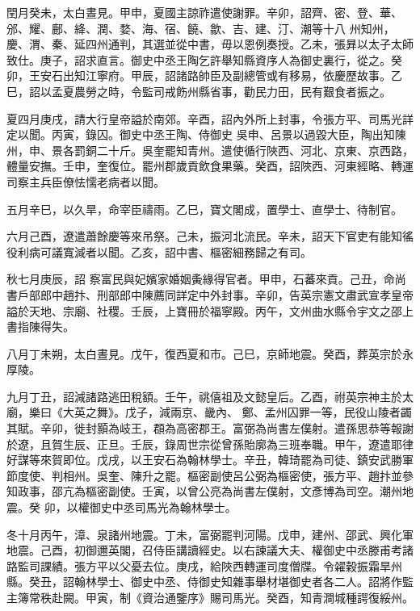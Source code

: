 \begin{pinyinscope}
 閏月癸未，太白晝見。甲申，夏國主諒祚遣使謝罪。辛卯，詔齊、密、登、華、邠、耀、鄜、絳、潤、婺、海、宿、饒、歙、吉、建、汀、潮等十八
 州知州，慶、渭、秦、延四州通判，其選並從中書，毋以恩例奏授。乙未，張昪以太子太師致仕。庚子，詔求直言。御史中丞王陶乞許舉知縣資序人為御史裏行，從之。癸卯，王安石出知江寧府。甲辰，詔諸路帥臣及副總管或有移易，依慶歷故事。乙巳，詔以孟夏農勞之時，令監司戒飭州縣省事，勸民力田，民有艱食者振之。



 夏四月庚戌，請大行皇帝謚於南郊。辛酉，詔內外所上封事，令張方平、司馬光詳定以聞。丙寅，錄囚。御史中丞王陶、侍御史
 吳申、呂景以過毀大臣，陶出知陳州，申、景各罰銅二十斤。吳奎罷知青州。遣使循行陜西、河北、京東、京西路，體量安撫。壬申，奎復位。罷州郡歲貢飲食果藥。癸酉，詔陜西、河東經略、轉運司察主兵臣僚怯懦老病者以聞。



 五月辛巳，以久旱，命宰臣禱雨。乙巳，寶文閣成，置學士、直學士、待制官。



 六月己酉，遼遣蕭餘慶等來吊祭。己未，振河北流民。辛未，詔天下官吏有能知徭役利病可議寬減者以聞。乙亥，詔中書、樞密細務歸之有司。



 秋七月庚辰，詔
 察富民與妃嬪家婚姻夤緣得官者。甲申，石蕃來貢。己丑，命尚書戶部郎中趙抃、刑部郎中陳薦同詳定中外封事。辛卯，告英宗憲文肅武宣孝皇帝謚於天地、宗廟、社稷。壬辰，上寶冊於福寧殿。丙午，文州曲水縣令宇文之邵上書指陳得失。



 八月丁未朔，太白晝見。戊午，復西夏和市。己巳，京師地震。癸酉，葬英宗於永厚陵。



 九月丁丑，詔減諸路逃田稅額。壬午，祧僖祖及文懿皇后。乙酉，祔英宗神主於太廟，樂曰《大英之舞》。戊子，減兩京、畿內、
 鄭、孟州囚罪一等，民役山陵者蠲其賦。辛卯，徙封顥為岐王，頵為高密郡王。富弼為尚書左僕射。遣孫思恭等報謝於遼，且賀生辰、正旦。壬辰，錄周世宗從曾孫貽廓為三班奉職。甲午，遼遣耶律好謀等來賀即位。戊戌，以王安石為翰林學士。辛丑，韓琦罷為司徒、鎮安武勝軍節度使、判相州。吳奎、陳升之罷。樞密副使呂公弼為樞密使，張方平、趙抃並參知政事，邵亢為樞密副使。壬寅，以曾公亮為尚書左僕射，文彥博為司空。潮州地震。癸
 卯，以權御史中丞司馬光為翰林學士。



 冬十月丙午，漳、泉諸州地震。丁未，富弼罷判河陽。戊申，建州、邵武、興化軍地震。己酉，初御邇英閣，召侍臣講讀經史。以右諫議大夫、權御史中丞滕甫考諸路監司課績。張方平以父憂去位。庚戌，給陜西轉運司度僧牒。令糴穀振霜旱州縣。癸丑，詔翰林學士、御史中丞、侍御史知雜事舉材堪御史者各二人。詔將作監主簿常秩赴闕。甲寅，制《資治通鑒序》賜司馬光。癸酉，知青澗城種諤復綏州。




\end{pinyinscope}
